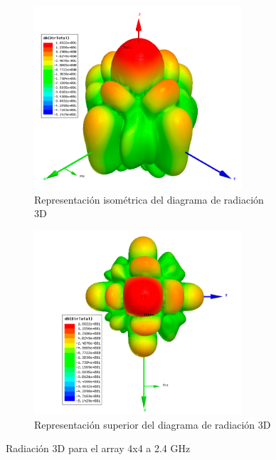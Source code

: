 \begin{figure}[H]
     \centering
     \begin{subfigure}[b]{0.7\textwidth}
         \centering
         \includegraphics[width=0.85\textwidth]{archivos/analisis/4x41/6}
         \caption{Representación isométrica del diagrama de radiación 3D}
         \label{fig:3d14x41}
     \end{subfigure}
     \hfill
     \begin{subfigure}[b]{0.7\textwidth}
         \centering
         \includegraphics[width=0.85\textwidth]{archivos/analisis/4x41/7}
         \caption{Representación superior del diagrama de radiación 3D}
         \label{fig:3d24x41}
     \end{subfigure}
     \hfill
        \caption{Radiación 3D para el array 4x4 a 2.4 GHz}
        \label{fig:3d4x41}
\end{figure}

